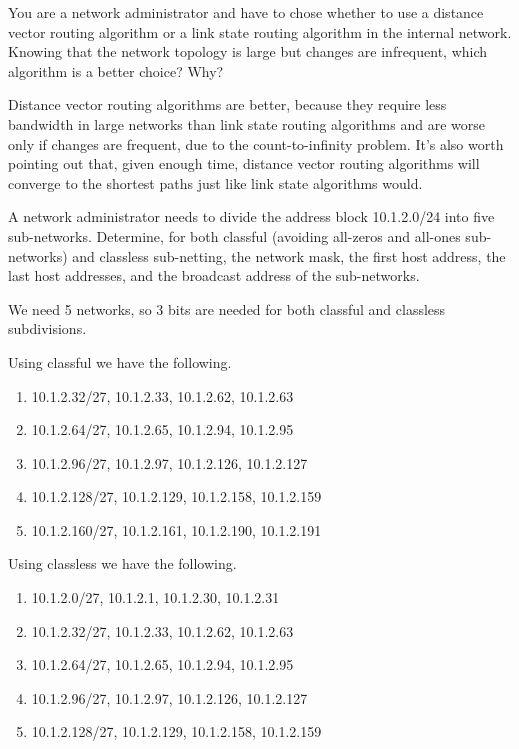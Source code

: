 \begin{Exercise}
You are a network administrator and have to chose whether to use a distance vector routing algorithm or a link state routing algorithm in the internal network.
Knowing that the network topology is large but changes are infrequent, which algorithm is a better choice? Why?
\end{Exercise}
\begin{Answer}
Distance vector routing algorithms are better, because they require less bandwidth in large networks than link state routing algorithms and are worse only if changes are frequent, due to the count-to-infinity problem.
It's also worth pointing out that, given enough time, distance vector routing algorithms will converge to the shortest paths just like link state algorithms would.
\end{Answer}

\begin{Exercise}
A network administrator needs to divide the address block 10.1.2.0/24 into five sub-networks.
Determine, for both classful (avoiding all-zeros and all-ones sub-networks) and classless sub-netting, the network mask, the first host address, the last host addresses, and the broadcast address of the sub-networks.
\end{Exercise}
\begin{Answer}
We need 5 networks, so 3 bits are needed for both classful and classless subdivisions.

Using classful we have the following.
\begin{enumerate}
\item 10.1.2.32/27, 10.1.2.33, 10.1.2.62, 10.1.2.63
\item 10.1.2.64/27, 10.1.2.65, 10.1.2.94, 10.1.2.95
\item 10.1.2.96/27, 10.1.2.97, 10.1.2.126, 10.1.2.127
\item 10.1.2.128/27, 10.1.2.129, 10.1.2.158, 10.1.2.159
\item 10.1.2.160/27, 10.1.2.161, 10.1.2.190, 10.1.2.191
\end{enumerate}

Using classless we have the following.
\begin{enumerate}
\item 10.1.2.0/27, 10.1.2.1, 10.1.2.30, 10.1.2.31
\item 10.1.2.32/27, 10.1.2.33, 10.1.2.62, 10.1.2.63
\item 10.1.2.64/27, 10.1.2.65, 10.1.2.94, 10.1.2.95
\item 10.1.2.96/27, 10.1.2.97, 10.1.2.126, 10.1.2.127
\item 10.1.2.128/27, 10.1.2.129, 10.1.2.158, 10.1.2.159
\end{enumerate}
\end{Answer}

